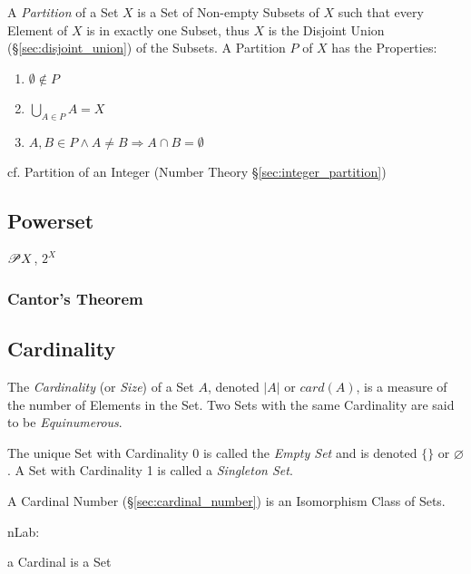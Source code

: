 A \emph{Partition} of a Set $X$ is a Set of Non-empty Subsets of $X$
such that every Element of $X$ is in exactly one Subset, thus $X$ is
the Disjoint Union (\S\ref{sec:disjoint_union}) of the Subsets. A
Partition $P$ of $X$ has the Properties:
\begin{enumerate}
  \item $\emptyset \notin P$
  \item $\bigcup_{A \in P}A = X$
  \item $A,B \in P \wedge A \neq B \Rightarrow A \cap B = \emptyset$
\end{enumerate}

cf. Partition of an Integer (Number Theory \S\ref{sec:integer_partition})



\subsection{Powerset}\label{sec:powerset}

$\mathscr{P}{X}$, $2^X$

\subsubsection{Cantor's Theorem}\label{sec:cantors_theorem}



\subsection{Cardinality}\label{sec:cardinality}

The \emph{Cardinality} (or \emph{Size}) of a Set $A$, denoted $|A|$ or
$card(A)$, is a measure of the number of Elements in the Set. Two Sets
with the same Cardinality are said to be \emph{Equinumerous}.

The unique Set with Cardinality 0 is called the \emph{Empty Set} and
is denoted $\{\}$ or $\varnothing$. A Set with Cardinality 1 is called a
\emph{Singleton Set}.

A Cardinal Number (\S\ref{sec:cardinal_number}) is an Isomorphism
Class of Sets.

nLab:

a Cardinal is a Set

